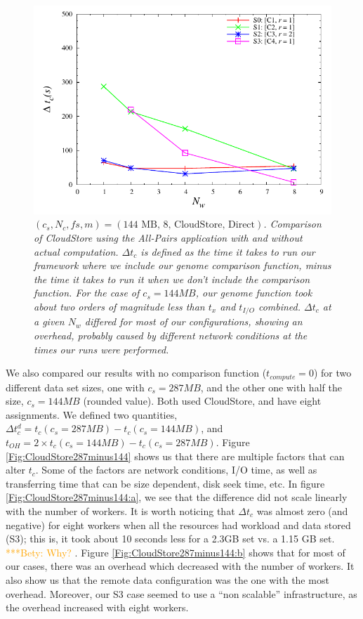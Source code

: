 \documentclass{rspublic}
\newcommand{\betynote}[1]{ {\textcolor{orange} { ***Bety: #1 }}}
\begin{document}
\begin{figure}
\begin{center}
\includegraphics[scale=0.5]{data/graphs/CloudStoreComputeMinusNoCompute144}
\caption{\textit{$(c_s, N_c, fs, m) = (\mbox{144 MB, 8, CloudStore,
Direct})$. Comparison of CloudStore using the All-Pairs application with
and without actual computation. $\Delta t_c$ is  defined as the time it
takes to run our framework where we include our genome comparison
function, minus the time it takes to run it when we don't include the
comparison function. For the case of $c_s=144MB$, our genome function
took about two orders of magnitude less than $t_x$ and $t_{I/O}$
combined. $\Delta t_c$ at a given $N_w$ differed for most of our
configurations, showing an overhead, probably caused by different
network conditions at the times our runs were performed.}}
\label{Fig:experiment4}
\end{center}
\end{figure}

We also compared our results with no comparison function
($t_{compute}=0$) for two different data set sizes, one with $c_s =
287MB$, and the other one with half the size, $c_s = 144MB$ (rounded
value). Both used CloudStore, and have eight assignments. We defined two
quantities, $\Delta t_c^d = t_c(c_s = 287MB) -  t_c(c_s = 144MB)$, and
$t_{OH} = 2 \times t_c(c_s = 144MB) - t_c(c_s = 287MB)$. Figure
\ref{Fig:CloudStore287minus144} shows us that there are multiple factors
that can alter $t_c$. Some of the factors are network conditions, I/O
time, as well as transferring time that can be size dependent, disk seek
time, etc. In figure \ref{Fig:CloudStore287minus144:a}, we see that the
difference did not scale linearly with the number of workers. It is
worth noticing that $\Delta t_c$ was almost zero (and negative) for
eight workers when all the resources had workload and data stored (S3);
this is, it took about 10 seconds less for a 2.3GB set vs. a 1.15 GB
set. \betynote {Why?}.  Figure \ref{Fig:CloudStore287minus144:b} shows
that for most of our cases, there was an overhead which decreased with
the number of workers. It also show us that the remote data
configuration was the one with the most overhead. Moreover, our S3 case
seemed to use a ``non scalable'' infrastructure, as the overhead
increased with eight workers.
\end{document}
